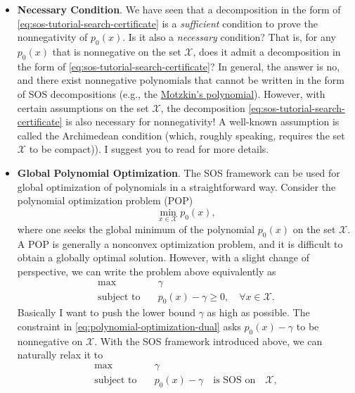 \documentclass[
]{book}
\theoremstyle{definition}
\theoremstyle{definition}
\theoremstyle{definition}
\theoremstyle{definition}
\theoremstyle{remark}
\begin{document}
\begin{itemize}
\item
  \textbf{Necessary Condition}. We have seen that a decomposition in the form of \eqref{eq:sos-tutorial-search-certificate} is a \emph{sufficient} condition to prove the nonnegativity of \(p_0(x)\). Is it also a \emph{necessary} condition? That is, for any \(p_0(x)\) that is nonnegative on the set \(\mathcal{X}\), does it admit a decomposition in the form of \eqref{eq:sos-tutorial-search-certificate}? In general, the answer is no, and there exist nonnegative polynomials that cannot be written in the form of SOS decompositions (e.g., the \href{https://en.wikipedia.org/wiki/Theodore_Motzkin}{Motzkin's polynomial}). However, with certain assumptions on the set \(\mathcal{X}\), the decomposition \eqref{eq:sos-tutorial-search-certificate} is also necessary for nonnegativity! A well-known assumption is called the Archimedean condition (which, roughly speaking, requires the set \(\mathcal{X}\) to be compact)). I suggest you to read \citep{blekherman12book-semidefinite} for more details.
\item
  \textbf{Global Polynomial Optimization}. The SOS framework can be used for global optimization of polynomials in a straightforward way. Consider the polynomial optimization problem (POP)
  \[
  \min_{x \in \mathcal{X}} p_0(x),
  \]
  where one seeks the global minimum of the polynomial \(p_0(x)\) on the set \(\mathcal{X}\).
  A POP is generally a nonconvex optimization problem, and it is difficult to obtain a globally optimal solution. However, with a slight change of perspective, we can write the problem above equivalently as
  \begin{equation}
  \begin{split}
  \max & \quad \gamma \\
  \text{subject to} & \quad p_0(x) - \gamma \geq 0, \quad \forall x \in \mathcal{X}.
  \end{split}
  \label{eq:polynomial-optimization-dual}
  \end{equation}
  Basically I want to push the lower bound \(\gamma\) as high as possible. The constraint in \eqref{eq:polynomial-optimization-dual} asks \(p_0(x) -\gamma\) to be nonnegative on \(\mathcal{X}\). With the SOS framework introduced above, we can naturally relax it to
  \begin{equation}
  \begin{split}
  \max & \quad \gamma \\
  \text{subject to} & \quad p_0(x) - \gamma \quad \text{is SOS on} \quad \mathcal{X},

\end{split}
\end{equation}
\end{itemize}
\end{document}
